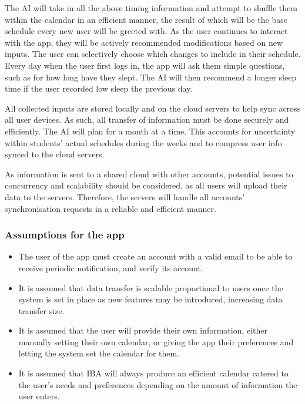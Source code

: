 \documentclass[a4paper,11pt]{article} %
\begin{document}
The AI will take in all the above timing information and attempt to shuffle them within the calendar in an efficient manner, the result of which will be the base schedule every new user will be greeted with. As the user continues to interact with the app, they will be actively recommended modifications based on new inputs. The user can selectively choose which changes to include in their schedule.
\newpage
Every day when the user first logs in, the app will ask them simple questions, such as for how long have they slept. The AI will then recommend a longer sleep time if the user recorded low sleep the previous day. 


All collected inputs are stored locally and on the cloud servers to help sync across all user devices. As such, all transfer of information must be done securely and efficiently.
The AI will plan for a month at a time. This accounts for uncertainty within students’ actual schedules during the weeks and to compress user info synced to the cloud servers. 

As information is sent to a shared cloud with other accounts, potential issues to concurrency and scalability should be considered, as all users will upload their data to the servers. 
Therefore, the servers will handle all accounts’ synchronisation requests in a reliable and efficient manner.

\subsubsection*{Assumptions for the app}
\begin{itemize}
    \item The user of the app must create an account with a valid email to be able to receive periodic notification, and verify its account. 
    \item It is assumed that data transfer is scalable proportional to users once the system is set in place as new features may be introduced, increasing data transfer size. 
    \item It is assumed that the user will provide their own information, either manually setting their own calendar, or giving the app their preferences and letting the system set the calendar for them.
    \item It is assumed that IBA will always produce an efficient calendar catered to the user’s needs and preferences depending on the amount of information the user enters.
\end{itemize}
\end{document}
